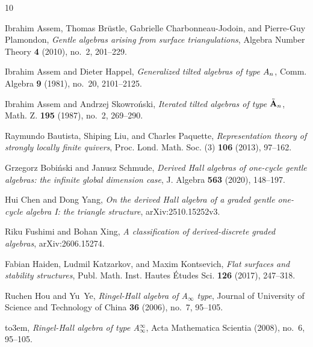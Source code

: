 \documentclass[reqno,12pt,a4paper]{amsart}
\theoremstyle{remark}
\theoremstyle{definition}
\numberwithin{equation}{section}
\begin{document}
\def\cprime{$'$}
\providecommand{\bysame}{\leavevmode\hbox to3em{\hrulefill}\thinspace}
\providecommand{\MR}{\relax\ifhmode\unskip\space\fi MR }
\providecommand{\MRhref}[2]{%
  \href{http://www.ams.org/mathscinet-getitem?mr=#1}{#2}
}
\providecommand{\href}[2]{#2}
\begin{thebibliography}{10}

Ibrahim Assem, Thomas Br\"ustle, Gabrielle Charbonneau-Jodoin, and Pierre-Guy
  Plamondon, \emph{Gentle algebras arising from surface triangulations},
  Algebra Number Theory \textbf{4} (2010), no.~2, 201--229.

Ibrahim Assem and Dieter Happel, \emph{Generalized tilted algebras of type
  {$A\sb{n}$}}, Comm. Algebra \textbf{9} (1981), no.~20, 2101--2125.

Ibrahim Assem and Andrzej Skowro{\'n}ski, \emph{Iterated tilted algebras of
  type {$\tilde{\bf A}\sb n$}}, Math. Z. \textbf{195} (1987), no.~2, 269--290.

Raymundo Bautista, Shiping Liu, and Charles Paquette, \emph{Representation
  theory of strongly locally finite quivers}, Proc. Lond. Math. Soc. (3)
  \textbf{106} (2013), 97--162.

Grzegorz Bobi\'nski and Janusz Schmude, \emph{Derived {H}all algebras of
  one-cycle gentle algebras: the infinite global dimension case}, J. Algebra
  \textbf{563} (2020), 148--197.

Hui Chen and Dong Yang, \emph{On the derived {H}all algebra of a graded gentle
  one-cycle algebra {I}: the triangle structure}, arXiv:2510.15252v3.

Riku Fushimi and Bohan Xing, \emph{A classification of derived-discrete graded
  algebras}, arXiv:2606.15274.

Fabian Haiden, Ludmil Katzarkov, and Maxim Kontsevich, \emph{Flat surfaces and
  stability structures}, Publ. Math. Inst. Hautes \'Etudes Sci. \textbf{126}
  (2017), 247--318.

Ruchen Hou and Yu~Ye, \emph{Ringel-{H}all algebra of {A}$_\infty$ type},
  Journal of University of Science and Technology of China \textbf{36} (2006),
  no.~7, 95--105.

\bysame, \emph{Ringel-{H}all algebra of type {A}$ _\infty^\infty$}, Acta
  Mathematica Scientia (2008), no.~6, 95--105.


\end{thebibliography}
\end{document}
